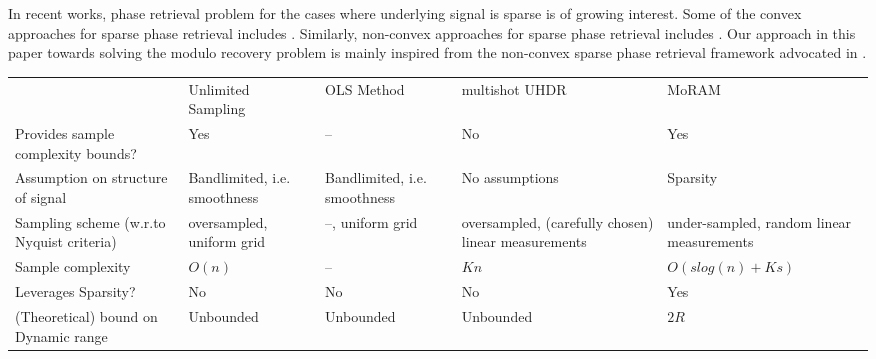 In recent works, phase retrieval problem for the cases where underlying signal is sparse is of growing interest. Some of the convex approaches for sparse phase retrieval includes \cite{ohlsson2012cprl, li2013sparse,bahmani2015efficient,jaganathan2012recovery}. Similarly, non-convex approaches for sparse phase retrieval includes \cite{netrapalli2013phase, cai2016optimal, wang2016sparse}. Our approach in this paper towards solving the modulo recovery problem is mainly inspired from the non-convex sparse phase retrieval framework advocated in \cite{Jagatap2017}. 



\begin{table*}[t]
	\centering
	\begin{tabular}{|p{3cm}|p{3cm}|p{2.5cm}|p{3cm}|p{3cm}|}
		\cline{1-5}
		& Unlimited Sampling~\cite{Bhandari}  & OLS Method~\cite{Cucuringu2018} & multishot UHDR~\cite{ICCP15_Zhao}  & MoRAM \\ \cline{1-5}

		Provides sample complexity bounds?  & Yes  & --  & No & Yes \\ \cline{1-5}
		Assumption on structure of signal  & Bandlimited, i.e. smoothness   & Bandlimited, i.e. smoothness &  No assumptions & Sparsity     \\ \cline{1-5}
		Sampling scheme (w.r.to Nyquist criteria)  & oversampled, uniform grid &  --, uniform grid  &  oversampled, (carefully chosen) linear measurements   & under-sampled,
		random linear measurements \\ \cline{1-5}
		Sample complexity  & $ O(n)$    & --    & $Kn$   & $O(slog(n) + Ks)$ \\ \cline{1-5}
		Leverages Sparsity?  & No & No   & No    & Yes \\ \cline{1-5}
		(Theoretical) bound on Dynamic range    & Unbounded   & Unbounded     & Unbounded   & $2R$  \\ \cline{1-5}                 
	\end{tabular}
\end{table*}

